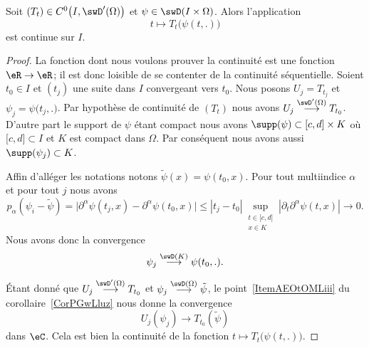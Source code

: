 \begin{proposition} \label{PropOTlWzog}
    Soit \( (T_t)\in C^0\big( I,\swD'(\Omega) \big)\) et \( \psi\in\swD(I\times \Omega)\). Alors l'application
    \begin{equation}
        t\mapsto T_t\big( \psi(t,.) \big)
    \end{equation}
    est continue sur \( I\).
\end{proposition}

\begin{proof}
    La fonction dont nous voulons prouver la continuité est une fonction \( \eR\to\eR\); il est donc loisible de se contenter de la continuité séquentielle. Soient \( t_0\in I\) et \( (t_j)\) une suite dans \( I\) convergeant vers \( t_0\). Nous posons \( U_j=T_{t_j}\) et \( \psi_j=\psi\big( t_j,. \big)\). Par hypothèse de continuité de \( (T_t)\) nous avons \( U_j\stackrel{\swD'(\Omega)}{\longrightarrow}T_{t_0}\). D'autre part le support de \( \psi\) étant compact nous avons \( \supp(\psi)\subset \mathopen[ c , d \mathclose]\times K\) où \( \mathopen[ c , d \mathclose]\subset I\) et \( K\) est compact dans \( \Omega\). Par conséquent nous avons aussi \( \supp(\psi_j)\subset K\).

    Affin d'alléger les notations notons \( \tilde \psi(x)=\psi(t_0,x)\). Pour tout multiindice \( \alpha\) et pour tout \( j\) nous avons
    \begin{equation}
        p_{\alpha}(\psi_i-\tilde \psi)=\Big|  \partial^{\alpha}\psi(t_j,x)-\partial^{\alpha}\psi(t_0,x)    \Big|\leq | t_j-t_0 |\sup_{\substack{t\in\mathopen[ c , d \mathclose]\\x\in K}}| \partial_t\partial^{\alpha}\psi(t,x) |\to 0.
    \end{equation}
    Nous avons donc la convergence
    \begin{equation}
        \psi_j\stackrel{\swD(K)}{\longrightarrow}\psi(t_0,.).
    \end{equation}

    Étant donné que \( U_j\stackrel{\swD'(\Omega)}{\longrightarrow}T_{t_0}\) et \( \psi_j\stackrel{\swD(\Omega)}{\longrightarrow}\tilde \psi\), le point~\ref{ItemAEOtOMLiii} du corollaire~\ref{CorPGwLluz} nous donne la convergence
    \begin{equation}
        U_j(\psi_j)\to T_{t_0}(\tilde \psi)
    \end{equation}
    dans \( \eC\). Cela est bien la continuité de la fonction \( t\mapsto T_t\big( \psi(t,.) \big)\).
\end{proof}



